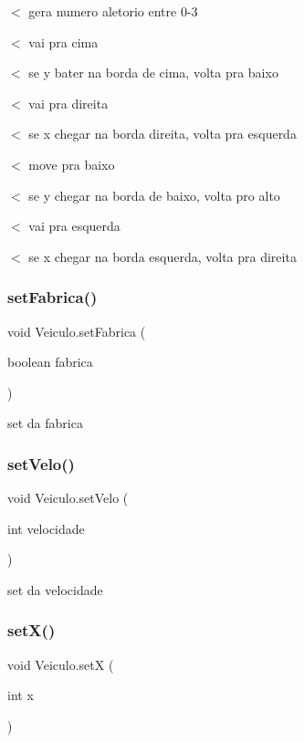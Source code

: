$<$ gera numero aletorio entre 0-\/3

$<$ vai pra cima

$<$ se y bater na borda de cima, volta pra baixo

$<$ vai pra direita

$<$ se x chegar na borda direita, volta pra esquerda

$<$ move pra baixo

$<$ se y chegar na borda de baixo, volta pro alto

$<$ vai pra esquerda

$<$ se x chegar na borda esquerda, volta pra direita \mbox{\label{class_veiculo_ae9a07a54a5824a9e8cace2c742034956}} 
\subsubsection{\texorpdfstring{set\+Fabrica()}{setFabrica()}}
{\footnotesize\ttfamily void Veiculo.\+set\+Fabrica (\begin{DoxyParamCaption}\item[{boolean}]{fabrica }\end{DoxyParamCaption})}



set da fabrica 

\mbox{\label{class_veiculo_a7c9b89bb072fedf9c24d1586ec31101b}} 
\subsubsection{\texorpdfstring{set\+Velo()}{setVelo()}}
{\footnotesize\ttfamily void Veiculo.\+set\+Velo (\begin{DoxyParamCaption}\item[{int}]{velocidade }\end{DoxyParamCaption})}



set da velocidade 

\mbox{\label{class_veiculo_a84b2207a013e6cd869959b73a93864b8}} 
\subsubsection{\texorpdfstring{set\+X()}{setX()}}
{\footnotesize\ttfamily void Veiculo.\+setX (\begin{DoxyParamCaption}\item[{int}]{x }\end{DoxyParamCaption})}



